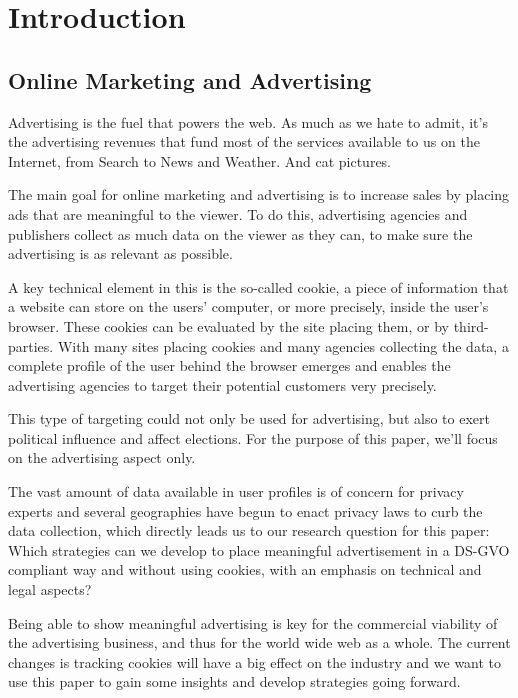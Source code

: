 %
%

\pagebreak
\section{Introduction}

\onehalfspacing

\subsection{Online Marketing and Advertising}

Advertising is the fuel that powers the web. As much as we hate to admit, it's the advertising revenues that fund most of the services available to us on the Internet, from Search to News and Weather. And cat pictures.

The main goal for online marketing and advertising is to increase sales by placing ads that are meaningful to the viewer. To do this, advertising agencies and publishers collect as much data on the viewer as they can, to make sure the advertising is as relevant as possible.

A key technical element in this is the so-called cookie, a piece of information that a website can store on the users' computer, or more precisely, inside the user's browser. These cookies can be evaluated by the site placing them, or by third-parties. With many sites placing cookies and many agencies collecting the data, a complete profile of the user behind the browser emerges and enables the advertising agencies to target their potential customers very precisely.

This type of targeting could not only be used for advertising, but also to exert political influence and affect elections. For the purpose of this paper, we'll focus on the advertising aspect only. 

The vast amount of data available in user profiles is of concern for privacy experts and several geographies have begun to enact privacy laws to curb the data collection, which directly leads us to our research question for this paper: Which strategies can we develop to place meaningful advertisement in a DS-GVO compliant way and without using cookies, with an emphasis on technical and legal aspects?

Being able to show meaningful advertising is key for the commercial viability of the advertising business, and thus for the world wide web as a whole. The current changes is tracking cookies will have a big effect on the industry and we want to use this paper to gain some insights and develop strategies going forward.

